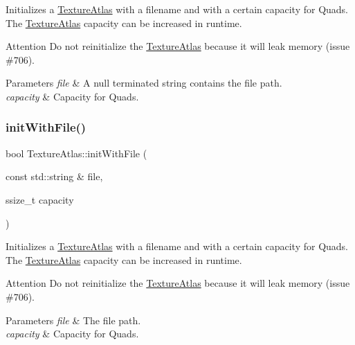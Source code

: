 Initializes a \hyperlink{classTextureAtlas}{Texture\+Atlas} with a filename and with a certain capacity for Quads. The \hyperlink{classTextureAtlas}{Texture\+Atlas} capacity can be increased in runtime.

\begin{DoxyAttention}{Attention}
Do not reinitialize the \hyperlink{classTextureAtlas}{Texture\+Atlas} because it will leak memory (issue \#706). 
\end{DoxyAttention}

\begin{DoxyParams}{Parameters}
{\em file} & A null terminated string contains the file path. \\
\hline
{\em capacity} & Capacity for Quads. \\
\hline
\end{DoxyParams}
\mbox{\label{classTextureAtlas_a325b82009a3ae2ec31ac42374eed1ab6}} 
\subsubsection{\texorpdfstring{init\+With\+File()}{initWithFile()}\hspace{0.1cm}{\footnotesize\ttfamily [2/2]}}
{\footnotesize\ttfamily bool Texture\+Atlas\+::init\+With\+File (\begin{DoxyParamCaption}\item[{const std\+::string \&}]{file,  }\item[{ssize\+\_\+t}]{capacity }\end{DoxyParamCaption})}

Initializes a \hyperlink{classTextureAtlas}{Texture\+Atlas} with a filename and with a certain capacity for Quads. The \hyperlink{classTextureAtlas}{Texture\+Atlas} capacity can be increased in runtime.

\begin{DoxyAttention}{Attention}
Do not reinitialize the \hyperlink{classTextureAtlas}{Texture\+Atlas} because it will leak memory (issue \#706). 
\end{DoxyAttention}

\begin{DoxyParams}{Parameters}
{\em file} & The file path. \\
\hline
{\em capacity} & Capacity for Quads. \\
\hline
\end{DoxyParams}
\mbox{\label{classTextureAtlas_a44ea8a3d38f0e758e33c6b10c725b44b}} 
